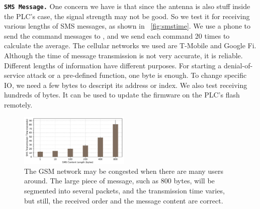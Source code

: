 %


\texttt{\textbf{SMS Message.}} One concern we have is that since the antenna is also stuff inside the PLC's case, the signal strength may not be good. So we test it for receiving various lengths of SMS messages, as shown in ~\autoref{fig:smstime}. We use a phone to send the command messages to \name, and we send each command 20 times to calculate the average. The cellular networks we used are T-Mobile and Google Fi. Although the time of message transmission is not very accurate, it is reliable. Different lengths of information have different purposes. For starting a denial-of-service attack or a pre-defined function, one byte is enough. To change specific IO, we need a few bytes to descript its address or index. We also test receiving hundreds of bytes. It can be used to update the firmware on the PLC's flash remotely.

\begin{figure}[th]
	\includegraphics[width=0.47\textwidth]{figures/smstime}
	\centering
	\caption{The GSM network may be congested when there are many users around. The large piece of message, such as 800 bytes, will be segmented into several packets, and the transmission time varies, but still, the received order and the message content are correct.}
	\label{fig:smstime}
\end{figure}

